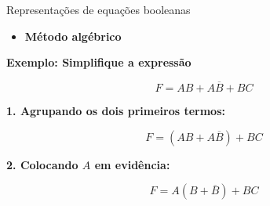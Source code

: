 
\begin{frame}{Representações de equações booleanas}

    \begin{itemize}
        \item \textbf{Método algébrico}
    \end{itemize}

    \vspace{0.3cm}

    \textbf{Exemplo: Simplifique a expressão}

    \[
        F = AB + A\overline{B} + BC
    \]

    \textbf{1. Agrupando os dois primeiros termos:}

    \[
        F = (AB + A\overline{B}) + BC
    \]

    \textbf{2. Colocando $A$ em evidência:}

    \[
        F = A(B + \overline{B}) + BC
    \]

\end{frame}